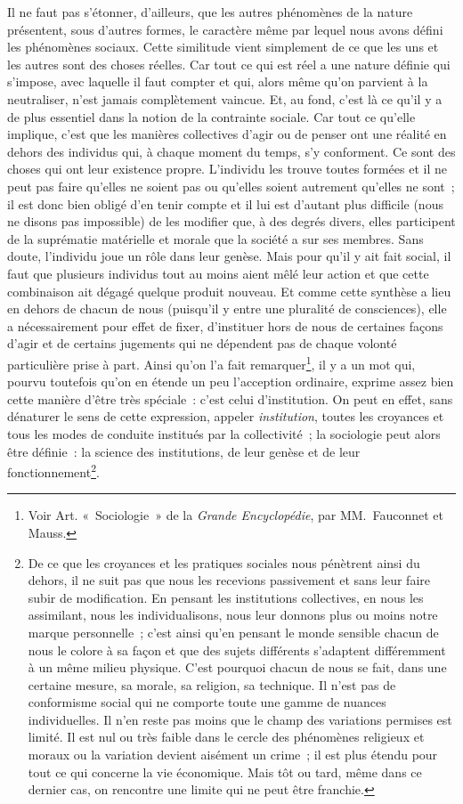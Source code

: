 \documentclass[french,twoside]{book} %
\begin{document}
Il ne faut pas s’étonner, d’ailleurs, que les autres phénomènes de la nature présentent, sous d’autres formes, le caractère même par lequel nous avons défini les phénomènes sociaux. Cette similitude vient simplement de ce que les uns et les autres sont des choses réelles. Car tout ce qui est réel a une nature définie qui s’impose, avec laquelle il faut compter et qui, alors même qu’on parvient à la neutraliser, n’est jamais complètement vaincue. Et, au fond, c’est là ce qu’il y a de plus essentiel dans la notion de la contrainte sociale. Car tout ce qu’elle implique, c’est que les manières collectives d’agir ou de penser ont une réalité en dehors des individus qui, à chaque moment du temps, s’y conforment. Ce sont des choses qui ont leur existence propre. L’individu les trouve toutes formées et il ne peut pas faire qu’elles ne soient pas ou qu’elles soient autrement qu’elles ne sont ; il est donc bien obligé d’en tenir compte et il lui est d’autant plus difficile (nous ne disons pas impossible) de les modifier que, à des degrés divers, elles participent de la suprématie matérielle et morale que la société a sur ses membres. Sans doute, l’individu joue un rôle dans leur genèse. Mais pour qu’il y ait fait social, il faut que plusieurs individus tout au moins aient mêlé leur action et que cette combinaison ait dégagé quelque produit nouveau. Et comme cette synthèse a lieu en dehors de chacun de nous (puisqu’il y entre une pluralité de consciences), elle a nécessairement pour effet de fixer, d’instituer hors de nous de certaines façons d’agir et de certains jugements qui ne dépendent pas de chaque volonté particulière prise à part. Ainsi qu’on l’a fait remarquer\footnote{ Voir Art. « Sociologie » de la \emph{Grande Encyclopédie}, par MM. Fauconnet et Mauss.}, il y a un mot qui, pourvu toutefois qu’on en étende un peu l’acception ordinaire, exprime assez bien cette manière d’être très spéciale : c’est celui d’institution. On peut en effet, sans dénaturer le sens de cette expression, appeler {\itshape institution}, toutes les croyances et tous les modes de conduite institués par la collectivité ; la sociologie peut alors être définie : la science des institutions, de leur genèse et de leur fonctionnement\footnote{ De ce que les croyances et les pratiques sociales nous pénètrent ainsi du dehors, il ne suit pas que nous les recevions passivement et sans leur faire subir de modification. En pensant les institutions collectives, en nous les assimilant, nous les individualisons, nous leur donnons plus ou moins notre marque personnelle ; c’est ainsi qu’en pensant le monde sensible chacun de nous le colore à sa façon et que des sujets différents s’adaptent différemment à un même milieu physique. C’est pourquoi chacun de nous se fait, dans une certaine mesure, sa morale, sa religion, sa technique. Il n’est pas de conformisme social qui ne comporte toute une gamme de nuances individuelles. Il n’en reste pas moins que le champ des variations permises est limité. Il est nul ou très faible dans le cercle des phénomènes religieux et moraux ou la variation devient aisément un crime ; il est plus étendu pour tout ce qui concerne la vie économique. Mais tôt ou tard, même dans ce dernier cas, on rencontre une limite qui ne peut être franchie.}.\par
\end{document}
